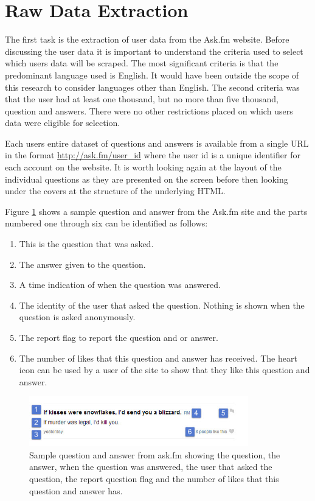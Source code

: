 \section{Raw Data Extraction}
\label{section:data_extraction}

The first task is the extraction of user data from the Ask.fm website. Before discussing the user data it is important to understand the criteria used to select which users data will be scraped. The most significant criteria is that the predominant language used is English. It would have been outside the scope of this research to consider languages other than English. The second criteria was that the user had at least one thousand, but no more than five thousand, question and answers. There were no other restrictions placed on which users data were eligible for selection.

Each users entire dataset of questions and answers is available from a single URL in the format \url{http://ask.fm/user_id} where the user id is a unique identifier for each account on the website. It is worth looking again at the layout of the individual questions as they are presented on the screen before then looking under the covers at the structure of the underlying HTML.

Figure \ref{fig:chapter4:sample_question} shows a sample question and answer from the Ask.fm site and the parts numbered one through six can be identified as follows:

\begin{enumerate}
	\item  This is the question that was asked.
	\item  The answer given to the question.
	\item  A time indication of when the question was answered.
	\item  The identity of the user that asked the question. Nothing is shown when the question is asked anonymously.
	\item  The report flag to report the question and or answer.
	\item  The number of likes that this question and answer has received. The heart icon can be used by a user of the site to show that they like this question and answer.
\end{enumerate}

\begin{figure}[htbp]
	\centering
	\includegraphics[width=0.85\textwidth]{Figures/Chapter4/sample_question.jpg}
	\caption[Sample question and answer]{Sample question and answer from ask.fm showing the question, the answer, when the question was answered, the user that asked the question, the report question flag and the number of likes that this question and answer has.}
	\label{fig:chapter4:sample_question}
\end{figure}


